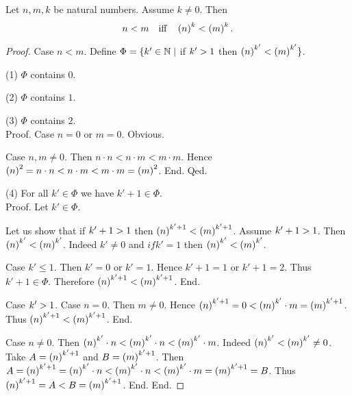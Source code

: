 \documentclass[../arithmetic.tex]{subfiles}
\begin{document}
  \begin{forthel}
    \begin{proposition}
      Let $n, m, k$ be natural numbers.
      Assume $k \neq 0$.
      Then \[ n < m \quad \text{iff} \quad \left(n\right)^{k} < \left(m\right)^{k}. \]
    \end{proposition}
    \begin{proof}
      Case $n \less m$.
        Define $\Phi = \{ k' \in \mathbb{N} \mid$ if $k' > 1$ then
        $\left(n\right)^{k'} < \left(m\right)^{k'} \}$.

        (1) $\Phi$ contains $0$.

        (2) $\Phi$ contains $1$.

        (3) $\Phi$ contains $2$. \\
        Proof.
          Case $n = 0$ or $m = 0$. Obvious.

          Case $n, m \neq 0$.
            Then $n \cdot n
              \less n \cdot m
              \less m \cdot m$.
            Hence $\left(n\right)^{2}
              = n \cdot n
              < n \cdot m
              < m \cdot m
              = \left(m\right)^{2}$.
          End.
        Qed.

        (4) For all $k' \in \Phi$ we have $k' \plus 1 \in \Phi$. \\
        Proof.
          Let $k' \in \Phi$.

          Let us show that if $k' + 1 > 1$ then
          $\left(n\right)^{k' + 1} < \left(m\right)^{k' + 1}$.
            Assume $k' + 1 > 1$.
            Then $\left(n\right)^{k'} < \left(m\right)^{k'}$.
            Indeed $k' \neq 0$ and $if k' = 1$ then $\left(n\right)^{k'} < \left(m\right)^{k'}$.

            Case $k' \leq 1$.
              Then $k' = 0$ or $k' = 1$.
              Hence $k' \plus 1 = 1$ or $k' \plus 1 = 2$.
              Thus $k' \plus 1 \in \Phi$.
              Therefore $\left(n\right)^{k' + 1} < \left(m\right)^{k' + 1}$.
            End.

            Case $k' > 1$.
              Case $n = 0$.
                Then $m \neq 0$.
                Hence $\left(n\right)^{k' + 1}
                  = 0
                  < \left(m\right)^{k'} \cdot m
                  = \left(m\right)^{k' + 1}$.
                Thus $\left(n\right)^{k' + 1} < \left(m\right)^{k' + 1}$.
              End.

              Case $n \neq 0$.
                Then $\left(n\right)^{k'} \cdot n
                  < \left(m\right)^{k'} \cdot n
                  < \left(m\right)^{k'} \cdot m$.
                Indeed $\left(n\right)^{k'} < \left(m\right)^{k'} \neq 0$.
                Take $A = \left(n\right)^{k' + 1}$ and $B = \left(m\right)^{k' + 1}$. %
                Then $A
                  = \left(n\right)^{k' + 1}
                  = \left(n\right)^{k'} \cdot n
                  < \left(m\right)^{k'} \cdot n
                  < \left(m\right)^{k'} \cdot m
                  = \left(m\right)^{k' + 1}
                  = B$.
                Thus $\left(n\right)^{k' + 1} = A < B = \left(m\right)^{k' + 1}$.
              End.
            End.


\end{proof}
\end{forthel}
\end{document}
